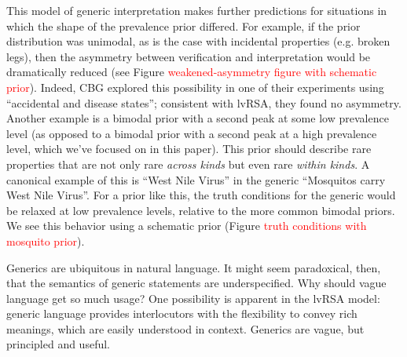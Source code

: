 \documentclass[10pt,letterpaper]{article}
\newcommand{\red}[1]{\textcolor{Red}{#1}}
\begin{document}
This model of generic interpretation makes further predictions for situations in which the shape of the prevalence prior differed. For example, if the prior distribution was unimodal, as is the case with incidental properties (e.g. broken legs), then the asymmetry between verification and interpretation would be dramatically reduced (see Figure \red{weakened-asymmetry figure with schematic prior}). Indeed, CBG explored this possibility in one of their experiments using ``accidental and disease states''; consistent with lvRSA, they found no asymmetry. 
%
Another example is a bimodal prior with a second peak at some low prevalence level (as opposed to a bimodal prior with a second peak at a high prevalence level, which we've focused on in this paper). This prior should describe rare properties that are not only rare \emph{across kinds} but even rare \emph{within kinds}. A canonical example of this is ``West Nile Virus'' in the generic ``Mosquitos carry West Nile Virus''. For a prior like this, the truth conditions for the generic would be relaxed at low prevalence levels, relative to the more common bimodal priors. We see this behavior using a schematic prior (Figure \red{truth conditions with mosquito prior}). 


Generics are ubiquitous in natural language. It might seem paradoxical, then, that the semantics of generic statements are underspecified. Why should vague language get so much usage? One possibility is apparent in the lvRSA model: generic language provides interlocutors with the flexibility to convey rich meanings, which are easily understood in context. 
Generics are vague, but principled and useful.

\end{document}
